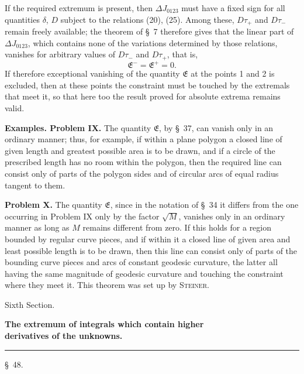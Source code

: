 \documentclass[11pt,a4paper,leqno]{article}
\begin{document}
If the required extremum is present, then $\Delta J_{0123}$ must have a fixed sign for all quantities $\delta$, $D$ subject to the relations (20), (25). Among these, $D\tau_+$ and $D\tau_-$ remain freely available; the theorem of \S~7 therefore gives that the linear part
of $\Delta J_{0123}$, which contains none of the variations determined by those relations, vanishes for arbitrary values of $D\tau_-$ and $D\tau_+$, that is,
\[
\mathfrak E^- = \mathfrak E^+=0.
\]
If therefore exceptional vanishing of the quantity $\mathfrak E$ at the points 1 and 2 is excluded, then at these points the constraint must be touched by the extremals that meet it, so that here too the result proved for absolute extrema remains valid.

\textbf{Examples. Problem IX.} The quantity $\mathfrak E$, by \S~37, can vanish only in an ordinary manner; thus, for example, if within a plane polygon a closed line of given length and greatest possible area is to be drawn, and if a circle of the prescribed length has no room within the polygon, then the required line can consist only of parts of the polygon sides and of circular arcs of equal radius tangent to them.

\textbf{Problem X.} The quantity $\mathfrak E$, since in the notation of \S~34 it differs from the one occurring in Problem IX only by the factor $\sqrt M$, vanishes only in an ordinary manner as long as $M$ remains different from zero. If this holds for a region bounded by regular curve pieces, and if within it a closed line of given area and least possible length is to be drawn, then this line can consist only of parts of the bounding curve pieces and arcs of constant geodesic curvature, the latter all having the same magnitude of geodesic curvature and touching the constraint where they meet it. This theorem was set up by \textsc{Steiner}.

\begin{center}
{\large Sixth Section.}\par
\vspace{2mm}
{\Large\bfseries The extremum of integrals which contain higher\\ derivatives of the unknowns.}\par
\vspace{2mm}\rule{32mm}{0.4pt}\par
\vspace{2mm}
{\large \S~48.}
\end{center}
\end{document}
